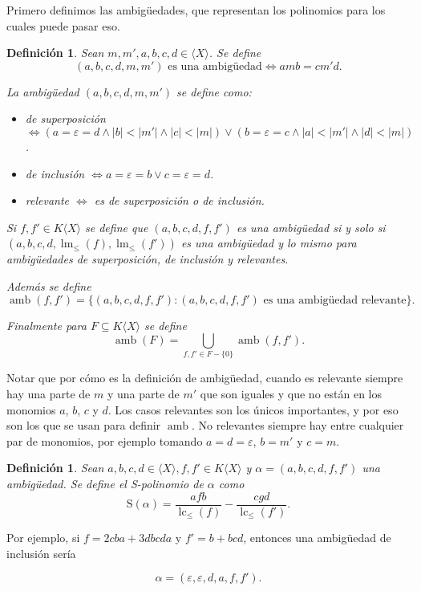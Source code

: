 \documentclass[12pt]{report}
\theoremstyle{customstyle}
\newtheorem{definition}[theorem]{Definición}
\theoremstyle{factstyle}
\DeclareMathOperator{\lm}{lm}
\DeclareMathOperator{\lc}{lc}
\DeclareMathOperator{\amb}{amb}
\renewcommand{\S}{\text{S}}
\begin{document}
Primero definimos las ambigüedades, que representan los polinomios para los cuales puede pasar eso.

\begin{definition}
  Sean $m, m', a, b, c, d ∈ ⟨X⟩$. Se define
  \[ (a, b, c, d, m, m')\text{ es una ambigüedad} ⇔ amb = cm'd \text{.}\]

  La ambigüedad $(a, b, c, d, m, m')$ se define como:
  \begin{itemize}
    \item de superposición $⇔ (a = ε = d ∧ |b| < |m'| ∧ |c| < |m|) ∨ (b = ε = c ∧ |a| < |m'| ∧ |d| < |m|)$.
    \item de inclusión $⇔ a = ε = b ∨ c = ε = d$.
    \item relevante $⇔$ es de superposición o de inclusión.
  \end{itemize}

  Si $f, f' ∈ K⟨X⟩$ se define que $(a, b, c, d, f, f')$ es una ambigüedad si y solo si $(a, b, c, d, \lm_≤{(f)}, \allowbreak \lm_≤{(f')})$ es una ambigüedad y lo mismo para ambigüedades de superposición, de inclusión y relevantes. %

  Además se define
  \[ \amb(f, f') = \{(a, b, c, d, f, f') : (a, b, c, d, f, f')\text{ es una ambigüedad relevante}\} \text{.} \]

  Finalmente para $F ⊆ K⟨X⟩$ se define
  \[ \amb(F) = ⋃_{f, f' ∈ F - \{0\}}{\amb(f, f')} \text{.} \]

\end{definition}

Notar que por cómo es la definición de ambigüedad, cuando es relevante siempre hay una parte de $m$ y una parte de $m'$ que son iguales y que no están en los monomios $a$, $b$, $c$ y $d$. Los casos relevantes son los únicos importantes, y por eso son los que se usan para definir $\amb$. No relevantes siempre hay entre cualquier par de monomios, por ejemplo tomando $a = d = ε$, $b = m'$ y $c = m$.

\begin{definition}
  Sean $a, b, c, d ∈ ⟨X⟩, f, f' ∈ K⟨X⟩$ y $α = (a, b, c, d, f, f')$ una ambigüedad. Se define el S-polinomio de $α$ como
  \[ \S(α) = \frac{afb}{\lc_≤{(f)}} - \frac{cgd}{\lc_≤{(f')}} \text{.}\]
\end{definition}

Por ejemplo, si $f = 2 cba + 3 dbcda$ y $f' = b + bcd$, entonces una ambigüedad de inclusión sería

\[α = (ε, ε, d, a, f, f') \text{.} \]
\end{document}
